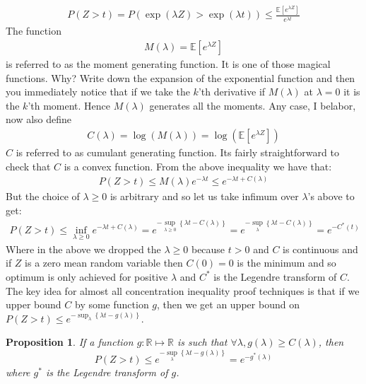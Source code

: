 \documentclass[11pt]{article}
\newcommand{\reals}{\ensuremath{\mathbb{R}}}
\newcommand{\Exp}[1]{\ensuremath{\mathbb{E}}\left[#1\right]}
\newtheorem{proposition}{Proposition}
\begin{document}
\begin{align*}
P(Z > t) = P(\exp(\lambda Z) > \exp(\lambda t))  \le \frac{\Exp{e^{\lambda Z}}}{e^{\lambda t}}
\end{align*}
The function 
\begin{align}\label{eq:MGF}
M(\lambda) = \Exp{e^{\lambda Z}}
\end{align}
 is referred to as the moment generating function. It is one of those magical functions. Why? Write down the expansion of the exponential function and then you immediately notice that if we take the $k$'th derivative if $M(\lambda)$ at $\lambda = 0$ it is the $k$'th moment. Hence $M(\lambda)$ generates all the moments. Any case, I belabor, now also define 
\begin{align}\label{eq:CGF}
C(\lambda) = \log\left( M(\lambda)\right) = \log\left( \Exp{e^{\lambda Z}}\right) 
\end{align}
$C$ is referred to as cumulant generating function. Its fairly straightforward to check that $C$ is a convex function. From the above inequality we have that:
\begin{align*}
P(Z > t) \le M(\lambda) e^{- \lambda t} \le e^{- \lambda t + C(\lambda)}
\end{align*}
But the choice of $\lambda \ge 0$ is arbitrary and so let us take infimum over $\lambda$'s above to get:
\begin{align*}
P(Z > t) \le \inf_{\lambda \ge 0} e^{- \lambda t + C(\lambda)} = e^{- \sup_{\lambda \ge 0}\left\{ \lambda t - C(\lambda) \right\}} = e^{- \sup_{\lambda}\left\{ \lambda t - C(\lambda) \right\}}  = e^{- C^*(t)}
\end{align*}
Where in the above we dropped the $\lambda \ge 0$ because $t >0$ and $C$ is continuous and if $Z$ is a zero mean random variable then $C(0) = 0$ is the minimum and so optimum is only achieved for positive $\lambda$ and $C^*$ is the Legendre transform of $C$. The key idea for almost all concentration inequality proof techniques is that if we upper bound $C$ by some function $g$, then we get an upper bound on $P(Z > t) \le e^{- \sup_{\lambda}\left\{ \lambda t - g(\lambda) \right\}} $. 

\begin{proposition}\label{prop:basic}
If a function $g:\reals \mapsto \reals$ is such that $\forall \lambda, g(\lambda) \ge C(\lambda)$, then
$$
P(Z > t) \le e^{- \sup_{\lambda}\left\{ \lambda t - g(\lambda) \right\}} = e^{- g^*(\lambda) }
$$
where $g^{*}$ is the Legendre transform of $g$.
\end{proposition}
\end{document}

